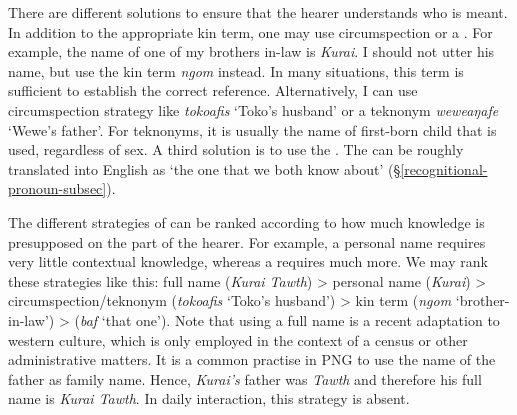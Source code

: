 \newpage 
There are different solutions to ensure that the hearer understands who is meant. In addition to the appropriate kin term, one may use circumspection or a  . For example, the name of one of my brothers in-law is \emph{Kurai}. I should not utter his name, but use the kin term \emph{ngom} instead. In many situations, this term is sufficient to establish the correct reference. Alternatively, I can use circumspection strategy like \emph{tokoafis} `Toko's husband' or a teknonym \emph{weweaŋafe} `Wewe's father'. For teknonyms, it is usually the name of first-born child that is used, regardless of sex. A third solution is to use the  . The   can be roughly translated into English as `the one that we both know about' (\S\ref{recognitional-pronoun-subsec}).

The different strategies of  can be ranked according to how much knowledge is presupposed on the part of the hearer. For example, a personal name requires very little contextual knowledge, whereas a   requires much more. We may rank these strategies like this: full name (\emph{Kurai Tawth}) > personal name (\emph{Kurai}) > circumspection/teknonym (\emph{tokoafis} `Toko's husband') > kin term (\emph{ngom} `brother-in-law') >  (\emph{baf} `that one'). Note that using a full name is a recent adaptation to western culture, which is only employed in the context of a census or other administrative matters. It is a common practise in PNG to use the name of the father as family name. Hence, \emph{Kurai's} father was \emph{Tawth} and therefore his full name is \emph{Kurai Tawth}. In daily interaction, this strategy is absent.

